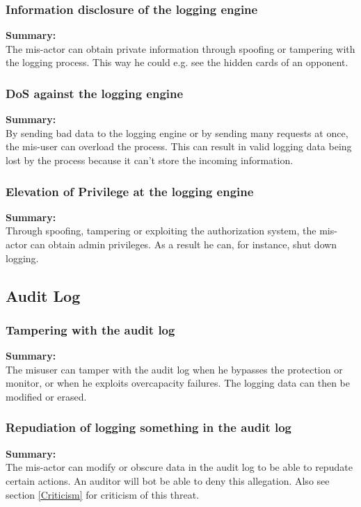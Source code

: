 \documentclass[a4paper,11pt]{report}
\begin{document}
\subsubsection{Information disclosure of the logging engine}
\label{LoggingEngineCasesI}
\textbf{Summary:} \\
The mis-actor can obtain private information through spoofing or tampering with the logging process. This way he could e.g. see the hidden cards of an opponent.

\subsubsection{DoS against the logging engine}
\label{LoggingEngineCasesD}
\textbf{Summary:} \\
By sending bad data to the logging engine or by sending many requests at once, the mis-user can overload the process. This can result in valid logging data being lost by the process because it can't store the incoming information.

\subsubsection{Elevation of Privilege at the logging engine}
\label{LoggingEngineCasesE}
\textbf{Summary:} \\
Through spoofing, tampering or exploiting the authorization system, the mis-actor can obtain admin privileges. As a result he can, for instance, shut down logging.

\subsection{Audit Log}
\label{AuditLogCases}

\subsubsection{Tampering with the audit log}
\label{AuditLogCasesT}
\textbf{Summary:} \\
The misuser can tamper with the audit log when he bypasses the protection or monitor, or when he exploits overcapacity failures. The logging data can then be modified or erased.

\subsubsection{Repudiation of logging something in the audit log}
\label{AuditLogCasesR}
\textbf{Summary:} \\
The mis-actor can modify or obscure data in the audit log to be able to
repudate certain actions. An auditor will bot be able to deny this
allegation.
Also see section \ref{Criticism} for criticism of this threat.
\end{document}
